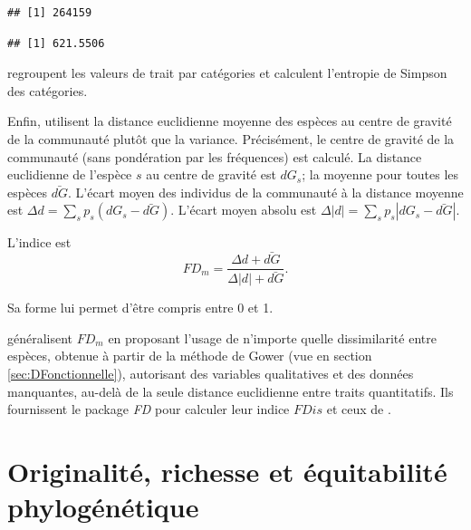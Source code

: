 \documentclass[
  11pt,
  french,
  a4paper,
  extrafontsizes,onecolumn,openright
  ]{memoir}
\newenvironment{Shaded}{\begin{snugshade}}{\end{snugshade}}
\newcommand{\KeywordTok}[1]{\textcolor[rgb]{0.13,0.29,0.53}{\textbf{#1}}}
\newcommand{\NormalTok}[1]{#1}
\newcommand{\OperatorTok}[1]{\textcolor[rgb]{0.81,0.36,0.00}{\textbf{#1}}}
\newcommand{\StringTok}[1]{\textcolor[rgb]{0.31,0.60,0.02}{#1}}
\begin{document}
\begin{verbatim}
## [1] 264159
\end{verbatim}

\begin{Shaded}
\end{Shaded}

\begin{verbatim}
## [1] 621.5506
\end{verbatim}

\normalsize

\textcite{Kader2007} regroupent les valeurs de trait par catégories et calculent l'entropie de Simpson des catégories.

Enfin, \textcite{Villeger2008a} utilisent la distance euclidienne moyenne des espèces au centre de gravité de la communauté plutôt que la variance.
Précisément, le centre de gravité de la communauté (sans pondération par les fréquences) est calculé.
La distance euclidienne de l'espèce \(s\) au centre de gravité est \(dG_s\); la moyenne pour toutes les espèces \(\bar{dG}\).
L'écart moyen des individus de la communauté à la distance moyenne est \(\Delta d=\sum_s{p_s(dG_s - \bar{dG})}\).
L'écart moyen absolu est \(\Delta |d|=\sum_s{p_s|dG_s - \bar{dG}|}\).

L'indice est
\begin{equation}
  \label{eq:FDm}
  \mathit{FD}_{m} = \frac{\Delta d + \bar{dG}}{\Delta |d| +\bar{dG}}.
\end{equation}

Sa forme lui permet d'être compris entre 0 et 1.

\textcite{Laliberte2010} généralisent \(\mathit{FD}_{m}\) en proposant l'usage de n'importe quelle dissimilarité entre espèces, obtenue à partir de la méthode de Gower (vue en section \ref{sec:DFonctionnelle}), autorisant des variables qualitatives et des données manquantes, au-delà de la seule distance euclidienne entre traits quantitatifs.
Ils fournissent le package \emph{FD} pour calculer leur indice \(\mathit{FDis}\) et ceux de
\textcite{Villeger2008a}.

\hypertarget{originalituxe9-richesse-et-uxe9quitabilituxe9-phyloguxe9nuxe9tique}{%
\section{Originalité, richesse et équitabilité phylogénétique}\label{originalituxe9-richesse-et-uxe9quitabilituxe9-phyloguxe9nuxe9tique}}
\end{document}
